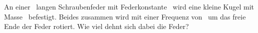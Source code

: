 An einer \LFeO\ langen Schraubenfeder mit Federkonstante \kFeO\ wird eine kleine Kugel mit Masse \mFeO\ befestigt. Beides zusammen wird mit einer Frequenz von \fFeO\ um das freie Ende der Feder rotiert. Wie viel dehnt sich dabei die Feder?
